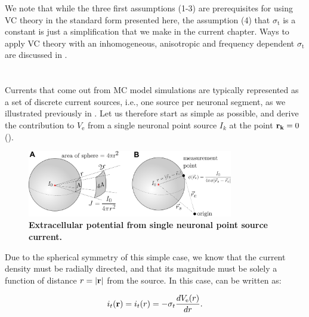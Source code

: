 We note that while the three first assumptions (1-3) are prerequisites for using VC theory in the standard form presented here, the assumption (4) that $\sigma_\mathrm{t}$ is a constant is just a simplification that we make in the current chapter. Ways to apply VC theory with an inhomogeneous, anisotropic and frequency dependent $\sigma_\mathrm{t}$ are discussed in .


\section{}
\label{sec:VC:pointsource}
Currents that come out from MC model simulations are typically represented as 
a set of discrete current sources, i.e., one source per neuronal segment, as we illustrated previously in . Let us therefore start as simple as possible, 
and derive the contribution to $V_\mathrm{e}$ from a single neuronal point source 
$I_k$ at the point ${\bf r_k}=0$ ().

\begin{figure}[!ht]
\begin{center}
\includegraphics[width=0.8\textwidth]{Figures/VC/EP_from_pointsource_illustration.png}
\end{center}
\caption{\textbf{Extracellular potential from single neuronal point source current.} 
}
\label{fig:VC:pointsource}
\end{figure}

Due to the spherical symmetry of this simple case, we know that the current density 
must be radially directed, and that its magnitude must be solely a function of distance $r = |{\bf r}|$ from the source.
In this case,  can be written as:

\begin{equation}
i_t({\bf r}) = i_t(r) = -\sigma_t \frac{dV_\mathrm{e}(r)}{dr}.
\end{equation}

